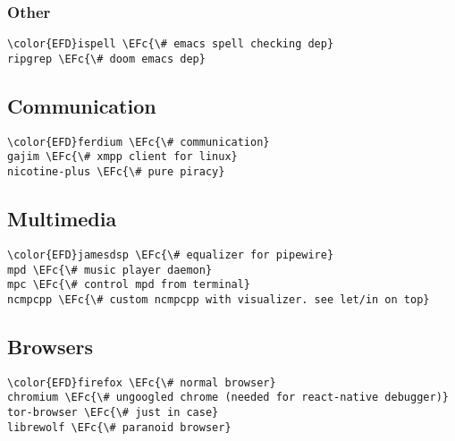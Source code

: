 \documentclass[14pt]{article}
\newcommand{\EFc}[1]{\textcolor{EFc}{#1}} %
\begin{document}
\subsubsection{Other}
\label{sec:org5225c5e}
\begin{Code}
\begin{Verbatim}
\color{EFD}ispell \EFc{\# emacs spell checking dep}
ripgrep \EFc{\# doom emacs dep}
\end{Verbatim}
\end{Code}
\subsection{Communication}
\label{sec:org61f883f}
\begin{Code}
\begin{Verbatim}
\color{EFD}ferdium \EFc{\# communication}
gajim \EFc{\# xmpp client for linux}
nicotine-plus \EFc{\# pure piracy}
\end{Verbatim}
\end{Code}
\subsection{Multimedia}
\label{sec:orgd807cff}
\begin{Code}
\begin{Verbatim}
\color{EFD}jamesdsp \EFc{\# equalizer for pipewire}
mpd \EFc{\# music player daemon}
mpc \EFc{\# control mpd from terminal}
ncmpcpp \EFc{\# custom ncmpcpp with visualizer. see let/in on top}
\end{Verbatim}
\end{Code}
\subsection{Browsers}
\label{sec:org7d96be2}
\begin{Code}
\begin{Verbatim}
\color{EFD}firefox \EFc{\# normal browser}
chromium \EFc{\# ungoogled chrome (needed for react-native debugger)}
tor-browser \EFc{\# just in case}
librewolf \EFc{\# paranoid browser}
\end{Verbatim}
\end{Code}
\end{document}
